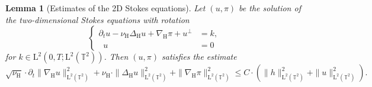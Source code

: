 \documentclass[10pt,a4paper]{amsart}
\newtheorem{lem}{Lemma}
\newcommand{\DeltaH}{\Delta_{\H}}
\renewcommand{\H}{\mathrm{H}}
\newcommand {\T}	{\mathbb{T}}
\DeclareMathOperator{\divH}{div_{\H}}
\newcommand{\nablaH}{\nabla_{\H}}
\newcommand{\rH}{\H}
\newcommand{\rL}{\mathrm{L}}
\begin{document}
\begin{lem}[Estimates of the 2D Stokes equations]\label{lem:2D NSE_2}
	Let $(u,\pi)$ be the solution of the two-dimensional Stokes equations with rotation
	\begin{equation*} 
		\left\{
		\begin{aligned}
			\partial_t u - \nu_{\rH} \DeltaH u + \nablaH \pi + u^\perp &= k,\\
			\divH u &= 0
		\end{aligned}
		\right. 
	\end{equation*} 
	for $k \in \rL^2(0,T;\rL^2(\T^2))$. Then $(u,\pi)$ satisfies the estimate 
	\begin{equation*}
		\sqrt{\nu_{\rH}} \cdot \partial_t \| \nablaH u \|_{\rL^2(\T^2)}^2
		+ \nu_{\rH} \cdot \| \DeltaH u \|_{\rL^2(\T^2)}^2
		+ \| \nablaH \pi \|_{\rL^2(\T^2)}^2
		\leq C \cdot (\| h \|_{\rL^2(\T^2)}^2+\| u \|_{\rL^2(\T^2)}^2) .
	\end{equation*}
\end{lem}
\end{document}
